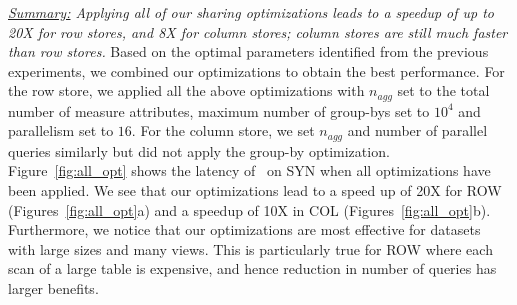 {\em \underline{Summary:} Applying all of our sharing optimizations
leads to a speedup of up to 20X for row stores, and 8X for column stores;
column stores are still much faster than row stores.}
Based on the optimal parameters identified from the previous experiments, we combined 
our optimizations to obtain the best performance. 
For the row store, we applied all the above optimizations with $n_{agg}$ set to
the total number of measure attributes, maximum number of group-bys set to $10^4$ and
parallelism set to $16$.
For the column store, we set $n_{agg}$ and number of parallel queries similarly
but did not apply the group-by optimization. 
Figure~\ref{fig:all_opt} shows the latency of \SeeDB\ on SYN when all
optimizations have been applied.
We see that our optimizations lead to a speed up of 20X for ROW 
(Figures~\ref{fig:all_opt}a) and a speedup of 10X in COL (Figures~\ref{fig:all_opt}b).
Furthermore, we notice that our optimizations are most effective for datasets with 
large sizes and many views. This is particularly true for ROW where each scan
of a large table is expensive, and hence reduction in number of queries 
has larger benefits.


